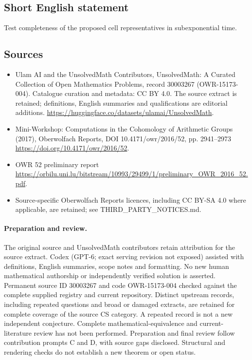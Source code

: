 \documentclass[11pt]{article}
\begin{document}
\subsection{Short English statement}
Test completeness of the proposed cell representatives in subexponential time.
\subsection{Sources}
\begin{itemize}
\item[\hypertarget{source:30003267:1}{S1}] Ulam AI and the UnsolvedMath Contributors, UnsolvedMath: A Curated Collection of Open Mathematics Problems, record 30003267 (OWR-15173-004). Catalogue curation and metadata: CC BY 4.0. The source extract is retained; definitions, English summaries and qualifications are editorial additions.
\url{https://huggingface.co/datasets/ulamai/UnsolvedMath}.
\item[\hypertarget{source:30003267:2}{S2}] Mini-Workshop: Computations in the Cohomology of Arithmetic Groups (2017), Oberwolfach Reports, DOI 10.4171/owr/2016/52, pp. 2941--2973
\url{https://doi.org/10.4171/owr/2016/52}.
\item[\hypertarget{source:30003267:3}{S3}] OWR 52 preliminary report
\url{https://orbilu.uni.lu/bitstream/10993/29499/1/preliminary_OWR_2016_52.pdf}.
\item Source-specific Oberwolfach Reports licences, including CC BY-SA 4.0 where applicable, are retained; see THIRD\_PARTY\_NOTICES.md.
\end{itemize}
\paragraph{Preparation and review.}
The original source and UnsolvedMath contributors retain attribution for the source extract. Codex (GPT-6; exact serving revision not exposed) assisted with definitions, English summaries, scope notes and formatting. No new human mathematical authorship or independently verified solution is asserted. Permanent source ID 30003267 and code OWR-15173-004 checked against the complete supplied registry and current repository. Distinct upstream records, including repeated questions and broad or damaged extracts, are retained for complete coverage of the source CS category. A repeated record is not a new independent conjecture. Complete mathematical-equivalence and current-literature review has not been performed. Preparation and final review follow contribution prompts C and D, with source gaps disclosed. Structural and rendering checks do not establish a new theorem or open status.
\label{end:30003267}
\end{document}
